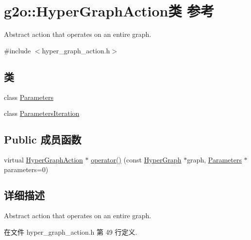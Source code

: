 \hypertarget{classg2o_1_1HyperGraphAction}{\section{g2o\-:\-:Hyper\-Graph\-Action类 参考}
\label{classg2o_1_1HyperGraphAction}
}


Abstract action that operates on an entire graph.  




{\ttfamily \#include $<$hyper\-\_\-graph\-\_\-action.\-h$>$}

\subsection*{类}
\begin{DoxyCompactItemize}
\item 
class \hyperlink{classg2o_1_1HyperGraphAction_1_1Parameters}{Parameters}
\item 
class \hyperlink{classg2o_1_1HyperGraphAction_1_1ParametersIteration}{Parameters\-Iteration}
\end{DoxyCompactItemize}
\subsection*{Public 成员函数}
\begin{DoxyCompactItemize}
\item 
virtual \hyperlink{classg2o_1_1HyperGraphAction}{Hyper\-Graph\-Action} $\ast$ \hyperlink{classg2o_1_1HyperGraphAction_aea392eafa65ab432a3c4d1dabde9bdbe}{operator()} (const \hyperlink{classg2o_1_1HyperGraph}{Hyper\-Graph} $\ast$graph, \hyperlink{classg2o_1_1HyperGraphAction_1_1Parameters}{Parameters} $\ast$parameters=0)
\end{DoxyCompactItemize}


\subsection{详细描述}
Abstract action that operates on an entire graph. 

在文件 hyper\-\_\-graph\-\_\-action.\-h 第 49 行定义.



